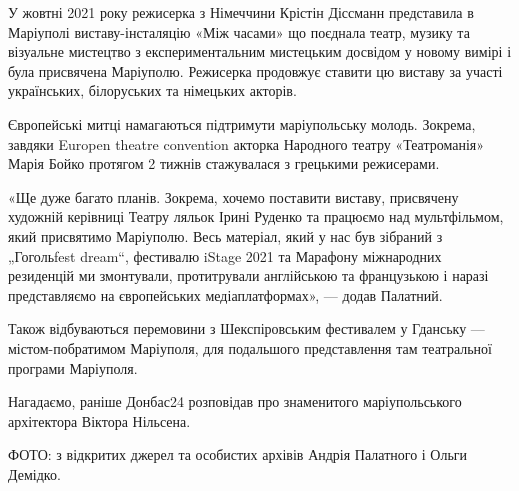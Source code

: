 У жовтні 2021 року режисерка з Німеччини Крістін Діссманн представила в
Маріуполі виставу-інсталяцію «Між часами» що поєднала театр, музику та
візуальне мистецтво з експериментальним мистецьким досвідом у новому вимірі і
була присвячена Маріуполю. Режисерка продовжує ставити цю виставу за участі
українських, білоруських та німецьких акторів.

Європейські митці намагаються підтримути маріупольську молодь. Зокрема, завдяки
Europen theatre convention акторка Народного театру «Театроманія» Марія Бойко
протягом 2 тижнів стажувалася з грецькими режисерами. 

«Ще дуже багато планів. Зокрема, хочемо поставити виставу, присвячену художній
керівниці Театру ляльок Ірині Руденко та працюємо над мультфільмом, який
присвятимо Маріуполю. Весь матеріал, який у нас був зібраний з „Гогольfest
dream“, фестивалю iStage 2021 та Марафону міжнародних резиденцій ми змонтували,
протитрували англійською та французькою і наразі представляємо на європейських
медіаплатформах», — додав Палатний.

Також відбуваються перемовини з Шекспіровським фестивалем у Гданську —
містом-побратимом Маріуполя, для подальшого представлення там театральної
програми Маріуполя. 

Нагадаємо, раніше Донбас24 розповідав про знаменитого маріупольського
архітектора Віктора Нільсена.

ФОТО: з відкритих джерел та особистих архівів Андрія Палатного і Ольги Демідко.
